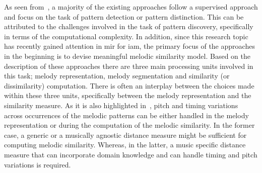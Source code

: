 As seen from~, a majority of the existing approaches follow a supervised approach and focus on the task of pattern detection or pattern distinction. This can be attributed to the challenges involved in the task of pattern discovery, specifically in terms of the computational complexity. In addition, since this research topic has recently gained attention in \gls{mir} for \gls{iam}, the primary focus of the approaches in the beginning is to devise meaningful melodic similarity model. Based on the description of these approaches there are three main processing units involved in this task; melody representation, melody segmentation and similarity (or dissimilarity) computation. There is often an interplay between the choices made within these three units, specifically between the melody representation and the similarity measure. As it is also highlighted in~\cite{gomez2003melody}, pitch and timing variations across occurrences of the melodic patterns can be either handled in the melody representation or during the computation of the melodic similarity. In the former case, a generic or a musically agnostic distance measure might be sufficient for computing melodic similarity. Whereas, in the latter, a music specific distance measure that can incorporate domain knowledge and can handle timing and pitch variations is required. 

